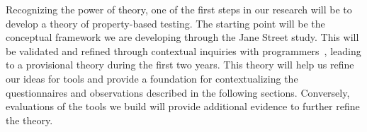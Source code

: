 Recognizing the power of theory, one of the first steps in our
research will be to develop a theory of property-based
testing. The starting point
will be the conceptual framework we are developing through the Jane Street study. This
will be validated and refined through contextual inquiries with
programmers~\cite[Ch.~3]{ref:holtzblatt1997contextual}, leading to a provisional
theory during the first two years.  This theory will help us
refine our ideas for
tools and provide a foundation for contextualizing the questionnaires and
observations described in the following sections. Conversely, evaluations of
the tools we build will provide additional evidence to further
refine the theory.



